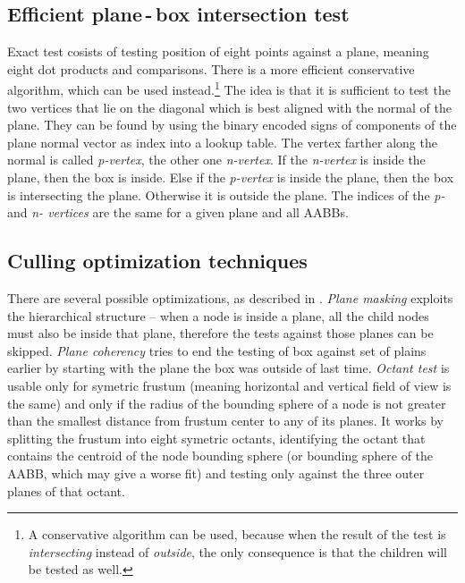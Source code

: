 \documentclass[report,11pt]{elsarticle}
\begin{document}
\subsection{Efficient plane\,-\,box intersection test}
Exact test cosists of testing position of eight points against a plane, meaning eight dot products and comparisons. There is a more efficient conservative algorithm, which can be used instead.\footnote{A conservative algorithm can be used, because when the result of the test is \emph{intersecting} instead of \emph{outside}, the only consequence is that the children will be tested as well.} The idea is that it is sufficient to test the two vertices that lie on the diagonal which is best aligned with the normal of the plane. They can be found by using the binary encoded signs of components of the plane normal vector as index into a lookup table. The vertex farther along the normal is called \emph{p-vertex}, the other one \emph{n-vertex}. If the \emph{n-vertex} is inside the plane, then the box is inside. Else if the \emph{p-vertex} is inside the plane, then the box is intersecting the plane. Otherwise it is outside the plane. The indices of the \emph{p-} and \emph{n- vertices} are the same for a given plane and all AABBs.

\subsection{Culling optimization techniques}
There are several possible optimizations, as described in \cite{Assarsson}. \emph{Plane masking} exploits the hierarchical structure -- when a node is inside a plane, all the child nodes must also be inside that plane, therefore the tests against those planes can be skipped. \emph{Plane coherency} tries to end the testing of box against set of plains earlier by starting with the plane the box was outside of last time. \emph{Octant test} is usable only for symetric frustum (meaning horizontal and vertical field of view is the same) and only if the radius of the bounding sphere of a node is not greater than the smallest distance from frustum center to any of its planes. It works by splitting the frustum into eight symetric octants, identifying the octant that contains the centroid of the node bounding sphere (or bounding sphere of the AABB, which may give a worse fit) and testing only against the three outer planes of that octant.

\end{document}
